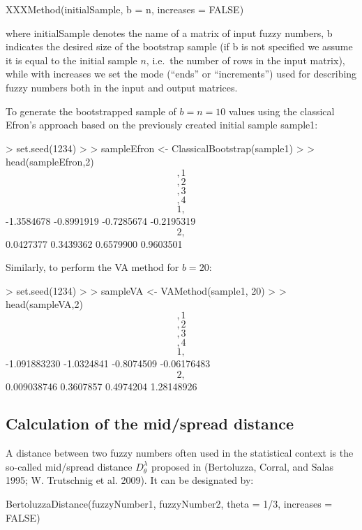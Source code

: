 \begin{example}
XXXMethod(initialSample, b = n, increases = FALSE)
\end{example}

where initialSample denotes the name of a matrix of input fuzzy numbers,
b indicates the desired size of the bootstrap sample (if b is not
specified we assume it is equal to the initial sample \(n\), i.e.~the
number of rows in the input matrix), while with increases we set the
mode (``ends'' or ``increments'') used for describing fuzzy numbers both in
the input and output matrices.

To generate the bootstrapped sample of \(b=n=10\) values using the
classical Efron's approach based on the previously created initial
sample sample1:

\begin{example}
\textgreater{} set.seed(1234) \textgreater{} \textgreater{} sampleEfron \textless- ClassicalBootstrap(sample1) \textgreater{}
\textgreater{} head(sampleEfron,2) \[,1\] \[,2\] \[,3\] \[,4\] \[1,\] -1.3584678
-0.8991919 -0.7285674 -0.2195319 \[2,\] 0.0427377 0.3439362 0.6579900
0.9603501
\end{example}

Similarly, to perform the VA method for \(b=20\):

\begin{example}
\textgreater{} set.seed(1234) \textgreater{} \textgreater{} sampleVA \textless- VAMethod(sample1, 20) \textgreater{} \textgreater{}
head(sampleVA,2) \[,1\] \[,2\] \[,3\] \[,4\] \[1,\] -1.091883230
-1.0324841 -0.8074509 -0.06176483 \[2,\] 0.009038746 0.3607857 0.4974204
1.28148926
\end{example}

\hypertarget{calculation-of-the-midspread-distance}{%
\subsection{Calculation of the mid/spread distance}\label{calculation-of-the-midspread-distance}}

A distance between two fuzzy numbers often used in the statistical
context is the so-called mid/spread distance \(D^{\lambda}_{\theta}\)
proposed in (Bertoluzza, Corral, and Salas 1995; W. Trutschnig et al. 2009). It can be designated by:

\begin{example}
BertoluzzaDistance(fuzzyNumber1, fuzzyNumber2, theta = 1/3, increases =
FALSE)
\end{example}

